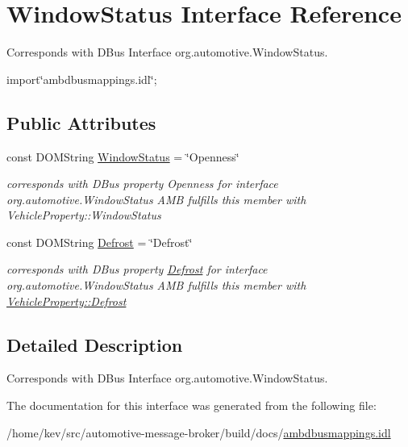\hypertarget{interfaceWindowStatus}{\section{Window\+Status Interface Reference}
\label{interfaceWindowStatus}
}


Corresponds with D\+Bus Interface org.\+automotive.\+Window\+Status.  




{\ttfamily import\char`\"{}ambdbusmappings.\+idl\char`\"{};}

\subsection*{Public Attributes}
\begin{DoxyCompactItemize}
\item 
\hypertarget{interfaceWindowStatus_a74f606f1b64d41de4c6f384a2b11e5cb}{const D\+O\+M\+String \hyperlink{interfaceWindowStatus_a74f606f1b64d41de4c6f384a2b11e5cb}{Window\+Status} = \char`\"{}Openness\char`\"{}}\label{interfaceWindowStatus_a74f606f1b64d41de4c6f384a2b11e5cb}

\begin{DoxyCompactList}\small\item\em corresponds with D\+Bus property Openness for interface org.\+automotive.\+Window\+Status A\+M\+B fulfills this member with Vehicle\+Property\+::\+Window\+Status \end{DoxyCompactList}\item 
\hypertarget{interfaceWindowStatus_a0bbf80007f7d60fa748fa730cb53fc12}{const D\+O\+M\+String \hyperlink{interfaceWindowStatus_a0bbf80007f7d60fa748fa730cb53fc12}{Defrost} = \char`\"{}Defrost\char`\"{}}\label{interfaceWindowStatus_a0bbf80007f7d60fa748fa730cb53fc12}

\begin{DoxyCompactList}\small\item\em corresponds with D\+Bus property \hyperlink{interfaceDefrost}{Defrost} for interface org.\+automotive.\+Window\+Status A\+M\+B fulfills this member with \hyperlink{classVehicleProperty_a1f1ade6fb94a977e8dbc31b3a90b1cc3}{Vehicle\+Property\+::\+Defrost} \end{DoxyCompactList}\end{DoxyCompactItemize}


\subsection{Detailed Description}
Corresponds with D\+Bus Interface org.\+automotive.\+Window\+Status. 

The documentation for this interface was generated from the following file\+:\begin{DoxyCompactItemize}
\item 
/home/kev/src/automotive-\/message-\/broker/build/docs/\hyperlink{ambdbusmappings_8idl}{ambdbusmappings.\+idl}\end{DoxyCompactItemize}
